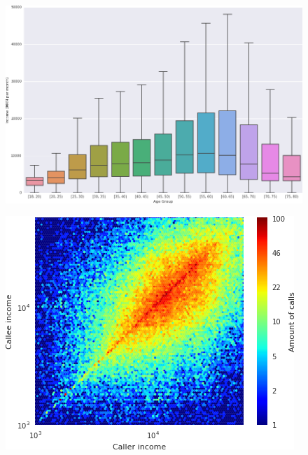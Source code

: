 \begin{figure}[]
\begin{center}
\includegraphics[width=1\columnwidth]{figures/income_age_boxplot4/income_age_boxplot4.png}
\caption{ \protect}
\end{center}
\end{figure}





\begin{figure}[]
\begin{center}
\includegraphics[width=1\columnwidth]{figures/Homophily_income_origin_target_1/Homophily_income_origin_target_1.png}
\caption{ \protect}
\end{center}
\end{figure}








{}



